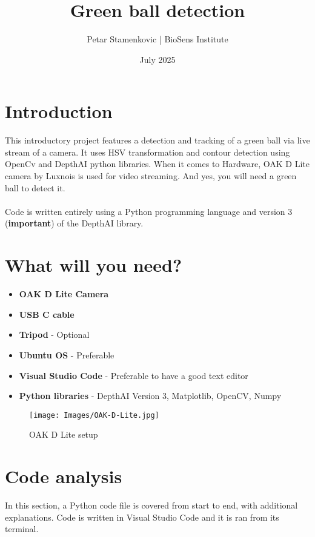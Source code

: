 \documentclass{article}
\title{Green ball detection}
\author{Petar Stamenkovic | BioSens Institute}
\date{July 2025}
\begin{document}
\maketitle

\newpage

\section{Introduction}
This introductory project features a detection and tracking of a green ball via live stream of a camera. It uses HSV transformation and contour detection using OpenCv and DepthAI python libraries. When it comes to Hardware, OAK D Lite camera by Luxnois is used for video streaming. And yes, you will need a green ball to detect it.
\\\\Code is written entirely using a Python programming language and version 3 (\textbf{important}) of the DepthAI library.

\section{What will you need?}
\begin{itemize}
    \item \textbf{OAK D Lite Camera} 

    \item \textbf{USB C cable}
    
    \item \textbf{Tripod} - Optional
    
    \item \textbf{Ubuntu OS} - Preferable 

    \item \textbf{Visual Studio Code} - Preferable to have a good text editor

    \item \textbf{Python libraries} - DepthAI Version 3, Matplotlib, OpenCV, Numpy

\end{itemize}

\begin{figure}[H]
    \centering
    \texttt{[image: Images/OAK-D-Lite.jpg]}
    \caption{OAK D Lite setup}
    \label{fig:enter-label}
\end{figure}

\newpage
\section{Code analysis}
In this section, a Python code file is covered from start to end, with additional explanations. Code is written in Visual Studio Code and it is ran from its terminal.
\end{document}
